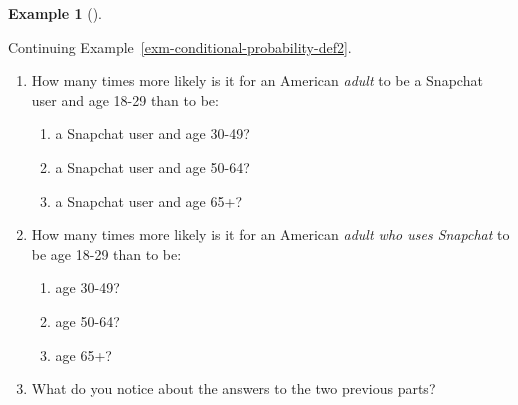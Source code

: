 \documentclass[
  letterpaper,
  DIV=11,
  numbers=noendperiod]{scrreprt}
\providecommand{\tightlist}{%
  \setlength{\itemsep}{0pt}\setlength{\parskip}{0pt}}
\theoremstyle{plain}
\theoremstyle{definition}
\newtheorem{example}{Example}[chapter]
\theoremstyle{definition}
\theoremstyle{definition}
\theoremstyle{remark}
\begin{document}
\begin{tcolorbox}[enhanced jigsaw, opacityback=0, left=2mm, colframe=quarto-callout-note-color-frame, toprule=.15mm, breakable, colback=white, leftrule=.75mm, arc=.35mm, rightrule=.15mm, bottomrule=.15mm]

\begin{example}[]\protect\hypertarget{exm-conditional-probability-def-slicing}{}\label{exm-conditional-probability-def-slicing}

Continuing Example~\ref{exm-conditional-probability-def2}.

\begin{enumerate}
\def\labelenumi{\arabic{enumi}.}
\tightlist
\item
  How many times more likely is it for an American \emph{adult} to be a
  Snapchat user and age 18-29 than to be:

  \begin{enumerate}
  \def\labelenumii{\alph{enumii}.}
  \tightlist
  \item
    a Snapchat user and age 30-49?
  \item
    a Snapchat user and age 50-64?
  \item
    a Snapchat user and age 65+?
  \end{enumerate}
\item
  How many times more likely is it for an American \emph{adult who uses
  Snapchat} to be age 18-29 than to be:

  \begin{enumerate}
  \def\labelenumii{\alph{enumii}.}
  \tightlist
  \item
    age 30-49?
  \item
    age 50-64?
  \item
    age 65+?
  \end{enumerate}
\item
  What do you notice about the answers to the two previous parts?
\end{enumerate}

\end{example}

\end{tcolorbox}
\end{document}
